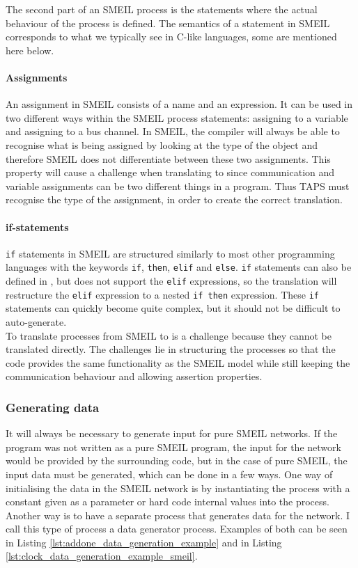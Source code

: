 The second part of an SMEIL process is the statements where the actual behaviour of the process is defined. The semantics of a statement in SMEIL corresponds to what we typically see in C-like languages, some are mentioned here below.
\paragraph{Assignments}
An assignment in SMEIL consists of a name and an expression. It can be used in two different ways within the SMEIL process statements: assigning to a variable and assigning to a bus channel. In SMEIL, the compiler will always be able to recognise what is being assigned by looking at the type of the object and therefore SMEIL does not differentiate between these two assignments. This property will cause a challenge when translating to \cspm{} since communication and variable assignments can be two different things in a \cspm{} program. Thus TAPS must recognise the type of the assignment, in order to create the correct translation.
\paragraph{if-statements}
\texttt{if} statements in SMEIL are structured similarly to most other programming languages with the keywords \texttt{if}, \texttt{then}, \texttt{elif} and \texttt{else}. \texttt{if} statements can also be defined in \cspm, but \cspm{} does not support the \texttt{elif} expressions, so the translation will restructure the \texttt{elif} expression to a nested \texttt{if then} expression. These \texttt{if} statements can quickly become quite complex, but it should not be difficult to auto-generate.\\

To translate processes from SMEIL to \cspm{} is a challenge because they cannot be translated directly. The challenges lie in structuring the \cspm{} processes so that the \cspm{} code provides the same functionality as the SMEIL model while still keeping the \cspm{} communication behaviour and allowing assertion properties.
\subsubsection{Generating data}
It will always be necessary to generate input for pure SMEIL networks. If the program was not written as a pure SMEIL program, the input for the network would be provided by the surrounding code, but in the case of pure SMEIL, the input data must be generated, which can be done in a few ways.
One way of initialising the data in the SMEIL network is by instantiating the process with a constant given as a parameter or hard code internal values into the process. Another way is to have a separate process that generates data for the network. I call this type of process a data generator process. Examples of both can be seen in Listing \ref{lst:addone_data_generation_example} and in Listing \ref{lst:clock_data_generation_example_smeil}.\\

